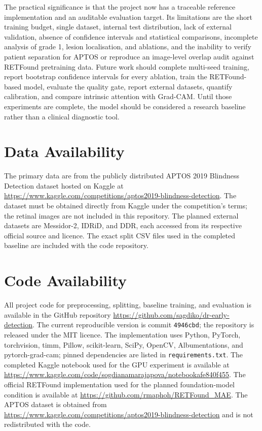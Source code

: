 \documentclass[11pt,a4paper]{article}
\begin{document}
The practical significance is that the project now has a traceable reference implementation and an auditable evaluation target. Its limitations are the short training budget, single dataset, internal test distribution, lack of external validation, absence of confidence intervals and statistical comparisons, incomplete analysis of grade 1, lesion localisation, and ablations, and the inability to verify patient separation for APTOS or reproduce an image-level overlap audit against RETFound pretraining data. Future work should complete multi-seed training, report bootstrap confidence intervals for every ablation, train the RETFound-based model, evaluate the quality gate, report external datasets, quantify calibration, and compare intrinsic attention with Grad-CAM. Until those experiments are complete, the model should be considered a research baseline rather than a clinical diagnostic tool.

\section*{Data Availability}
The primary data are from the publicly distributed APTOS 2019 Blindness Detection dataset hosted on Kaggle at \url{https://www.kaggle.com/competitions/aptos2019-blindness-detection}. The dataset must be obtained directly from Kaggle under the competition's terms; the retinal images are not included in this repository. The planned external datasets are Messidor-2, IDRiD, and DDR, each accessed from its respective official source and licence. The exact split CSV files used in the completed baseline are included with the code repository.

\section*{Code Availability}
All project code for preprocessing, splitting, baseline training, and evaluation is available in the GitHub repository \url{https://github.com/sagdiko/dr-early-detection}. The current reproducible version is commit \texttt{4946cbd}; the repository is released under the MIT licence. The implementation uses Python, PyTorch, torchvision, timm, Pillow, scikit-learn, SciPy, OpenCV, Albumentations, and pytorch-grad-cam; pinned dependencies are listed in \texttt{requirements.txt}. The completed Kaggle notebook used for the GPU experiment is available at \url{https://www.kaggle.com/code/sogdianamarajapova/notebookafe840f455}. The official RETFound implementation used for the planned foundation-model condition is available at \url{https://github.com/rmaphoh/RETFound_MAE}. The APTOS dataset is obtained from \url{https://www.kaggle.com/competitions/aptos2019-blindness-detection} and is not redistributed with the code.
\end{document}
